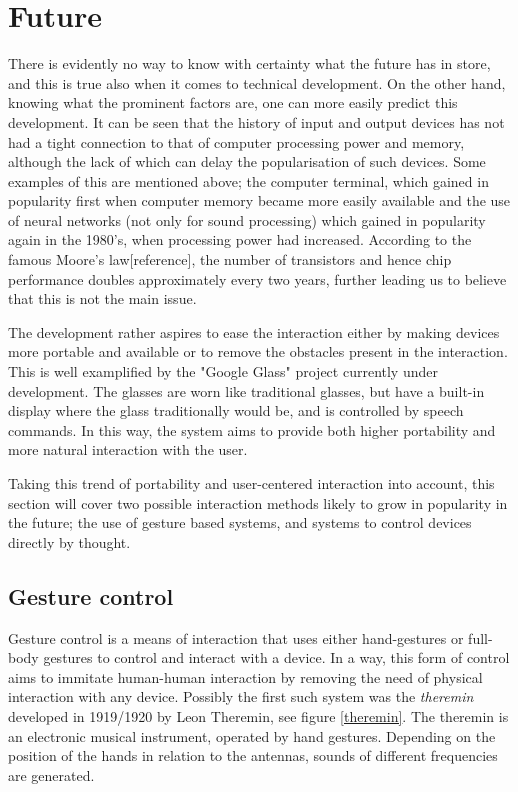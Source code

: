 
\section{Future}
\label{future}
There is evidently no way to know with certainty what the future has in store, and this is true also when it comes to technical development. On the other hand, knowing what the prominent factors are, one can more easily predict this development. It can be seen that the history of input and output devices has not had a tight connection to that of computer processing power and memory, although the lack of which can delay the popularisation of such devices. Some examples of this are mentioned above; the computer terminal, which gained in popularity first when computer memory became more easily available and the use of neural networks (not only for sound processing) which gained in popularity again in the 1980's, when processing power had increased. According to the famous Moore's law[reference], the number of transistors and hence chip performance doubles approximately every two years, further leading us to believe that this is not the main issue.

The development rather aspires to ease the interaction either by making devices more portable and available or to remove the obstacles present in the interaction. This is well examplified by the "Google Glass" project currently under development. The glasses are worn like traditional glasses, but have a built-in display where the glass traditionally would be, and is controlled by speech commands. In this way, the system aims to provide both higher portability and more natural interaction with the user.

Taking this trend of portability and user-centered interaction into account, this section will cover two possible interaction methods likely to grow in popularity in the future; the use of gesture based systems, and systems to control devices directly by thought. 


\subsection{Gesture control}
Gesture control is a means of interaction that uses either hand-gestures or full-body gestures to control and interact with a device. In a way, this form of control aims to immitate human-human interaction by removing the need of physical interaction with any device. Possibly the first such system was the \emph{theremin} developed in 1919/1920 by Leon Theremin, see figure \ref{theremin}. The theremin is an electronic musical instrument, operated by hand gestures. Depending on the position of the hands in relation to the antennas, sounds of different frequencies are generated\cite{thereminpatent}.

